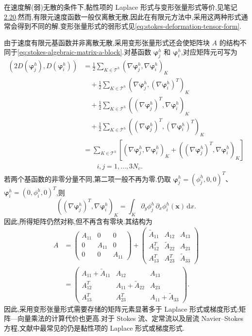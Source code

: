 \begin{note}[黏性项的变形张量形式]\label{note:stokes-deformation-tensor-implementation}
在速度解(弱)无散的条件下,黏性项的 Laplace 形式与变形张量形式等价,见笔记\hyperref[note:equivalent-term-forms]{2.20}.然而,有限元速度函数一般仅离散无散,因此在有限元方法中,采用这两种形式通常会得到不同的解.变形张量形式的弱形式见\cref{eq:stokes-deformation-tensor-form}.

由于速度有限元基函数并非离散无散,采用变形张量形式还会使矩阵块 $A$ 的结构不同于\cref{eq:stokes-algebraic-matrix-a-block}.对基函数 $\symbf{\varphi}_j^h$ 和 $\symbf{\varphi}_i^h$,对应矩阵元可写为
\[
\begin{aligned}
  (2D(\symbf{\varphi}_j^h),D(\symbf{\varphi}_i^h))
  &=\frac12\sum_{K\in\mathcal{T}^h}
      (\nabla\symbf{\varphi}_j^h,
       \nabla\symbf{\varphi}_i^h)_K\\
  &\quad+\frac12\sum_{K\in\mathcal{T}^h}
      (\nabla\symbf{\varphi}_j^h,
       (\nabla\symbf{\varphi}_i^h)^T)_K\\
  &\quad+\frac12\sum_{K\in\mathcal{T}^h}
      ((\nabla\symbf{\varphi}_j^h)^T,
       \nabla\symbf{\varphi}_i^h)_K\\
  &\quad+\frac12\sum_{K\in\mathcal{T}^h}
      ((\nabla\symbf{\varphi}_j^h)^T,
       (\nabla\symbf{\varphi}_i^h)^T)_K\\
  &=\sum_{K\in\mathcal{T}^h}
       \left[(\nabla\symbf{\varphi}_j^h,
              \nabla\symbf{\varphi}_i^h)_K
       +((\nabla\symbf{\varphi}_j^h)^T,
              \nabla\symbf{\varphi}_i^h)_K\right]\\
  &\qquad i,j=1,\ldots,3N_v.
\end{aligned}
\]
若两个基函数的非零分量不同,第二项一般不再为零.仍取
$\symbf{\varphi}_j^h=(\phi_j^h,0,0)^T$、
$\symbf{\varphi}_i^h=(0,\phi_i^h,0)^T$,则
\[
  ((\nabla\symbf{\varphi}_j^h)^T,
    \nabla\symbf{\varphi}_i^h)_K
  =\int_K\partial_y\phi_j^h\,\partial_x\phi_i^h(\bm{x})\,\mathrm{d}x.
\]
因此,所得矩阵仍然对称,但不再含有零块.其结构为
\[
\begin{aligned}
 A&=\begin{pmatrix}A_{11}&0&0\\0&A_{11}&0\\0&0&A_{11}\end{pmatrix}
   +\begin{pmatrix}
      \widetilde A_{11}&A_{12}&A_{13}\\
      A_{12}^T&\widetilde A_{22}&A_{23}\\
      A_{13}^T&A_{23}^T&\widetilde A_{33}
     \end{pmatrix}\\
  &=\begin{pmatrix}
      A_{11}+\widetilde A_{11}&A_{12}&A_{13}\\
      A_{12}^T&A_{11}+\widetilde A_{22}&A_{23}\\
      A_{13}^T&A_{23}^T&A_{11}+\widetilde A_{33}
     \end{pmatrix}.
\end{aligned}
\]
因此,采用变形张量形式需要存储的矩阵元素显著多于 Laplace 形式或梯度形式;矩阵—向量乘法的计算代价也更高.对于 Stokes 流、定常流以及层流 Navier--Stokes 方程,文献中最常见的仍是黏性项的 Laplace 形式或梯度形式.
\end{note}

